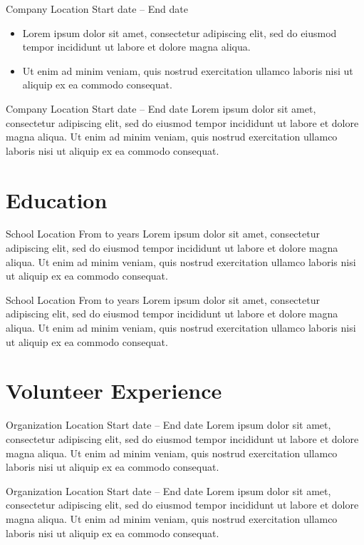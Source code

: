 \documentclass[12pt, a4paper]{effectivecv}
\begin{document}
{  
    {Company}
    {Location}
    {Start date -- End date}
    {
      \begin{itemize}
        \item Lorem ipsum dolor sit amet, consectetur adipiscing elit, sed do eiusmod tempor incididunt ut labore et dolore magna aliqua.
        \item Ut enim ad minim veniam, quis nostrud exercitation ullamco laboris nisi ut aliquip ex ea commodo consequat.
      \end{itemize}
    }

      {Company}
      {Location}
      {Start date -- End date}
      {Lorem ipsum dolor sit amet, consectetur adipiscing elit, sed do eiusmod tempor incididunt ut labore et dolore magna aliqua. Ut enim ad minim veniam, quis nostrud exercitation ullamco laboris nisi ut aliquip ex ea commodo consequat.}

  \section{Education}
    {School}
    {Location}
    {From to years}
    {Lorem ipsum dolor sit amet, consectetur adipiscing elit, sed do eiusmod tempor incididunt ut labore et dolore magna aliqua. Ut enim ad minim veniam, quis nostrud exercitation ullamco laboris nisi ut aliquip ex ea commodo consequat.}

    {School}
    {Location}
    {From to years}
    {Lorem ipsum dolor sit amet, consectetur adipiscing elit, sed do eiusmod tempor incididunt ut labore et dolore magna aliqua. Ut enim ad minim veniam, quis nostrud exercitation ullamco laboris nisi ut aliquip ex ea commodo consequat.}

  \section{Volunteer Experience}
    {Organization}
    {Location}
    {Start date -- End date}
    {Lorem ipsum dolor sit amet, consectetur adipiscing elit, sed do eiusmod tempor incididunt ut labore et dolore magna aliqua. Ut enim ad minim veniam, quis nostrud exercitation ullamco laboris nisi ut aliquip ex ea commodo consequat.}
    
    {Organization}
    {Location}
    {Start date -- End date}
    {Lorem ipsum dolor sit amet, consectetur adipiscing elit, sed do eiusmod tempor incididunt ut labore et dolore magna aliqua. Ut enim ad minim veniam, quis nostrud exercitation ullamco laboris nisi ut aliquip ex ea commodo consequat.}
}
\end{document}
